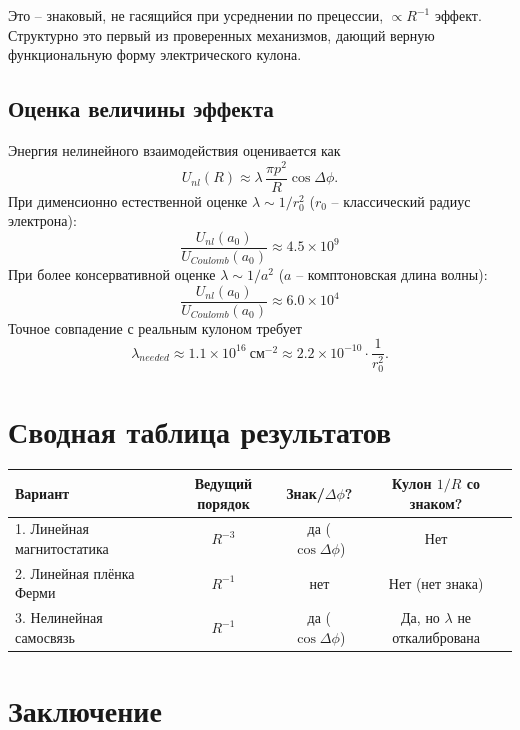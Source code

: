 \documentclass[12pt,a4paper]{article}
\begin{document}
Это -- знаковый, не гасящийся при усреднении по прецессии,
$\propto R^{-1}$ эффект. Структурно это первый из проверенных
механизмов, дающий верную функциональную форму электрического кулона.

\subsection{Оценка величины эффекта}

Энергия нелинейного взаимодействия оценивается как
\begin{equation}
U_{nl}(R) \approx \lambda\,\frac{\pi p^2}{R}\cos\Delta\phi.
\end{equation}
При дименсионно естественной оценке $\lambda\sim 1/r_0^2$
($r_0$ -- классический радиус электрона):
\begin{equation}
\frac{U_{nl}(a_0)}{U_{Coulomb}(a_0)} \approx 4.5\times10^{9}
\end{equation}
При более консервативной оценке $\lambda\sim 1/a^2$
($a$ -- комптоновская длина волны):
\begin{equation}
\frac{U_{nl}(a_0)}{U_{Coulomb}(a_0)} \approx 6.0\times10^{4}
\end{equation}
Точное совпадение с реальным кулоном требует
\begin{equation}
\lambda_{needed} \approx 1.1\times10^{16}\ \text{см}^{-2}
\approx 2.2\times10^{-10}\cdot\frac{1}{r_0^2}.
\end{equation}

\section{Сводная таблица результатов}

\begin{center}
\begin{tabular}{|l|c|c|c|}
\hline
Вариант & Ведущий порядок & Знак/$\Delta\phi$? & Кулон $1/R$ со знаком? \\
\hline
1. Линейная магнитостатика & $R^{-3}$ & да ($\cos\Delta\phi$) & Нет \\
2. Линейная плёнка Ферми & $R^{-1}$ & нет & Нет (нет знака) \\
3. Нелинейная самосвязь & $R^{-1}$ & да ($\cos\Delta\phi$) & Да, но $\lambda$ не откалибрована \\
\hline
\end{tabular}
\end{center}

\section{Заключение}
\end{document}
